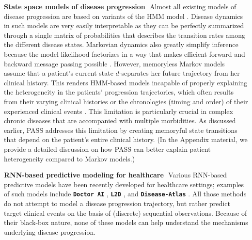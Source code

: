 \documentclass[twoside,11pt]{article}
\begin{document}
{\bf State space models of disease progression}\,\, Almost all existing models of disease progression are based on variants of the HMM model \cite{wang2014unsupervised,liu2015efficient,alaa2017learning}. Disease dynamics in such models are very easily interpretable as they can be perfectly summarized through a single matrix of probabilities that describes the transition rates among the different disease states. Markovian dynamics also greatly simplify inference because the model likelihood factorizes in a way that makes efficient forward and backward message passing possible \cite{murphy2002dynamic}. However, memoryless Markov models assume that a patient's current state $d$-separates her future trajectory from her clinical history. This renders HMM-based models incapable of properly explaining the heterogeneity in the patients' progression trajectories, which often results from their varying clinical histories or the chronologies (timing and order) of their experienced clinical events \cite{valderas2009defining}. This limitation is particularly crucial in complex chronic diseases that are accompanied with multiple morbidities. As discussed earlier, PASS addresses this limitation by creating memoryful state transitions that depend on the patient's entire clinical history. (In the Appendix material, we provide a detailed discussion on how PASS can better explain patient heterogeneity compared to Markov models.)

{\bf RNN-based predictive modeling for healthcare}\,\, Various RNN-based predictive models have been recently developed for healthcare settings; examples of such models include \textbf{\texttt{\small Doctor AI}} \cite{choi2016doctor}, \textbf{\texttt{\small L2D}} \cite{lipton2015learning}, and \textbf{\texttt{\small Disease-Atlas}} \cite{lim2018disease}. All those methods do not attempt to model a disease progression trajectory, but rather predict target clinical events on the basis of (discrete) sequential observations. Because of their black-box nature, none of these models can help understand the mechanisms underlying disease progression. 
\end{document}
